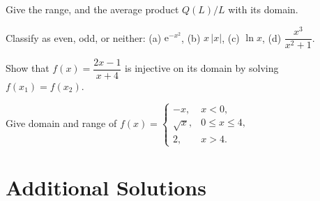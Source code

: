 \begin{problems}
        Give the range, and the average product $Q(L)/L$ with its domain.
  \item Classify as even, odd, or neither: (a) $\mathrm{e}^{-x^{2}}$,
        \;(b) $x\,|x|$, \;(c) $\ln x$, \;(d) $\dfrac{x^{3}}{x^{2}+1}$.
  \item Show that $f(x)=\dfrac{2x-1}{x+4}$ is injective on its domain by
        solving $f(x_{1})=f(x_{2})$.
  \item Give domain and range of
        $f(x)=\begin{cases} -x, & x<0,\\ \sqrt{x}, & 0\le x\le 4,\\
        2, & x>4.\end{cases}$
\end{problems}

\section{Additional Solutions}

